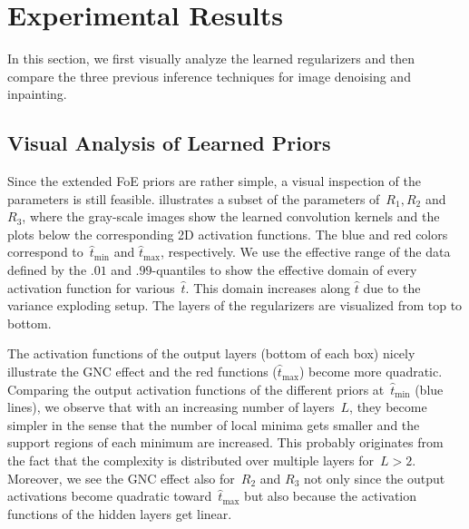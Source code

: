 \documentclass{article}
\def\hatt{{\widehat{t}}}
\newcommand{\tminh}{\hatt_\mathrm{min}}
\newcommand{\tmaxh}{\hatt_\mathrm{max}}
\theoremstyle{plain}
\theoremstyle{definition}
\theoremstyle{remark}
\begin{document}
\section{Experimental Results}
In this section, we first visually analyze the learned regularizers and then compare the three previous inference techniques for image denoising and inpainting.

\subsection{Visual Analysis of Learned Priors}
Since the extended FoE priors are rather simple, a visual inspection of the parameters is still feasible.
 illustrates a subset of the parameters of~$R_1,R_2$ and $R_3$, where the gray-scale images show the learned convolution kernels and the plots below the corresponding 2D activation functions.
The blue and red colors correspond to~$\tminh$ and $\tmaxh$, respectively.
We use the effective range of the data defined by the $.01$ and $.99$-quantiles to show the effective domain of every activation function for various~$\hatt$.
This domain increases along $\hatt$ due to the variance exploding setup.
The layers of the regularizers are visualized from top to bottom.

The activation functions of the output layers (bottom of each box) nicely illustrate the GNC effect and the red functions ($\tmaxh$) become more quadratic.
Comparing the output activation functions of the different priors at~$\tminh$ (blue lines), we observe that with an increasing number of layers~$L$, they become simpler in the sense that the number of local minima gets smaller and the support regions of each minimum are increased.
This probably originates from the fact that the complexity is distributed over multiple layers for~$L>2$.
Moreover, we see the GNC effect also for~$R_2$ and $R_3$ not only since the output activations become quadratic toward~$\tmaxh$ but also because the activation functions of the hidden layers get linear.
\end{document}
